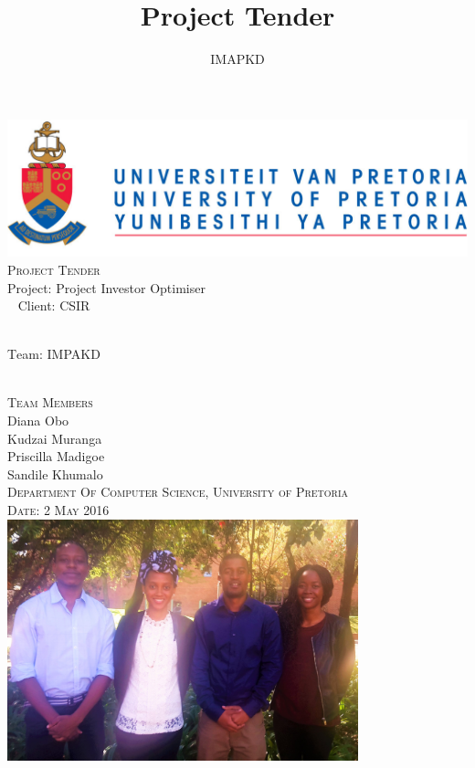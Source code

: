 \documentclass[a4paper,12pt]{article}
\author{IMAPKD}
\title{ Project Tender}
\begin{document}
\setlength{\parskip}{6pt}

\begin{titlepage}

\begin{center}
\includegraphics[width=1\textwidth]{./University_of_Pretoria_Logo.PNG}\\[0.4cm]    
\textsc{\Large Project Tender}\\[0.5cm]

{ \huge \textsc Project: Project Investor Optimiser }\\[0.4cm]\
{ \huge \textsc Client: CSIR  }\\[0.4cm]\

{ \huge \textsc Team: IMPAKD  }\\[0.4cm]\

\textsc{\Large Team Members}\\[0.5cm]

{\Large Diana {Obo}} \\[0.3cm]

{\Large Kudzai {Muranga}} \\[0.3cm]

{\Large Priscilla {Madigoe}}\\[0.3cm]

{\Large Sandile {Khumalo}}\\[0.5cm]

\textsc{ Department Of Computer Science, University of Pretoria}\\[0.3cm]
\textsc{Date: 2 May 2016}\\[0.3cm]

\includegraphics[width=4in]{./IMAPKD.jpg}

\vfill
\end{center}
\end{titlepage}
\end{document}
